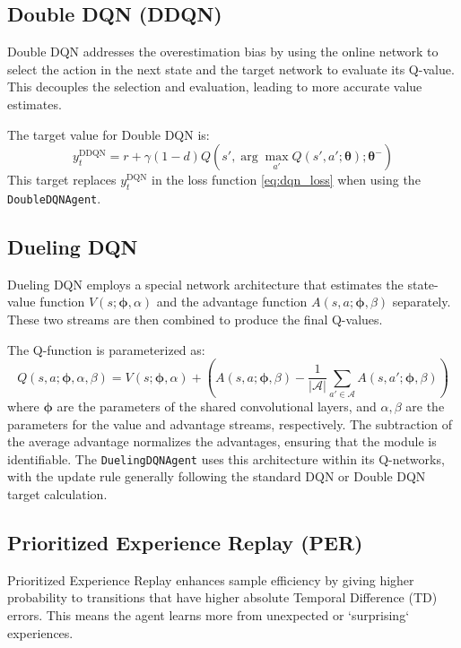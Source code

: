 \documentclass[conference]{IEEEtran}
\newcommand{\thetab}{\boldsymbol{\theta}}
\newcommand{\phib}{\boldsymbol{\phi}}
\newcommand{\Vfunc}{V}
\newcommand{\Afunc}{A}
\begin{document}
\subsection{Double DQN (DDQN)}

Double DQN \cite{vanhasselt2016deep} addresses the overestimation bias by using the online network to select the action in the next state and the target network to evaluate its Q-value. This decouples the selection and evaluation, leading to more accurate value estimates.

The target value for Double DQN is:
\begin{equation}
y_t^{\text{DDQN}} = r + \gamma (1 - d) Q(s', \arg\max_{a'} Q(s', a'; \thetab); \thetab^-)
\label{eq:ddqn_target}
\end{equation}
This target replaces \(y_t^{\text{DQN}}\) in the loss function \eqref{eq:dqn_loss} when using the \texttt{DoubleDQNAgent}.

\subsection{Dueling DQN}

Dueling DQN \cite{wang2016dueling} employs a special network architecture that estimates the state-value function \(\Vfunc(s; \phib, \alpha)\) and the advantage function \(\Afunc(s, a; \phib, \beta)\) separately. These two streams are then combined to produce the final Q-values.

The Q-function is parameterized as:
\begin{equation}
Q(s, a; \phib, \alpha, \beta) = \Vfunc(s; \phib, \alpha) + \left( \Afunc(s, a; \phib, \beta) - \frac{1}{|\mathcal{A}|} \sum_{a' \in \mathcal{A}} \Afunc(s, a'; \phib, \beta) \right)
\label{eq:dueling_q}
\end{equation}
where \(\phib\) are the parameters of the shared convolutional layers, and \(\alpha, \beta\) are the parameters for the value and advantage streams, respectively. The subtraction of the average advantage normalizes the advantages, ensuring that the module is identifiable. The \texttt{DuelingDQNAgent} uses this architecture within its Q-networks, with the update rule generally following the standard DQN or Double DQN target calculation.

\subsection{Prioritized Experience Replay (PER)}

Prioritized Experience Replay \cite{schaul2015prioritized} enhances sample efficiency by giving higher probability to transitions that have higher absolute Temporal Difference (TD) errors. This means the agent learns more from unexpected or `surprising` experiences.
\end{document}

